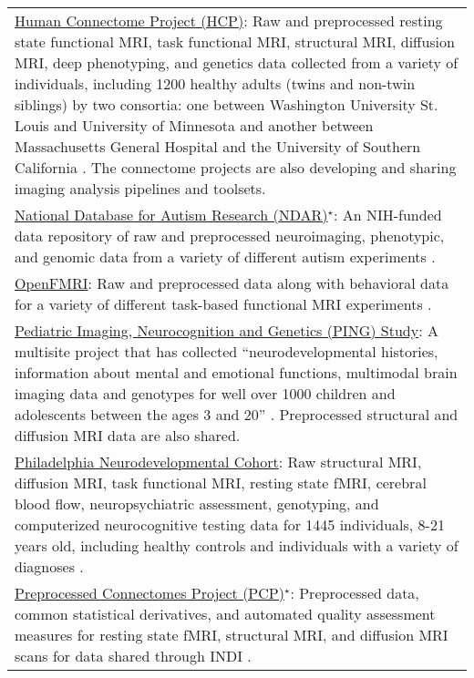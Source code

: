 \documentclass{bmcart}
\begin{document}
\begin{backmatter}
\begin{table}[h!]
\begin{tabular}{L{5.5in}}
        \href{http://www.humanconnectomeproject.org/}{Human Connectome Project (HCP)}: Raw and preprocessed resting state functional MRI, task functional MRI, structural MRI, diffusion MRI, deep phenotyping, and genetics data collected from a variety of individuals, including 1200 healthy adults (twins and non-twin siblings) by two consortia: one between Washington University St. Louis and University of Minnesota \cite{VanEssen2012} and another between Massachusetts General Hospital and the University of Southern California \cite{RosenHCP2010}. The connectome projects are also developing and sharing imaging analysis pipelines and toolsets.\\
        \href{http://ndar.nih.gov/}{National Database for Autism Research (NDAR)}$^{\star}$: An NIH-funded data repository of raw and preprocessed neuroimaging, phenotypic, and genomic data from a variety of different autism experiments \cite{NDAR}.\\	
        \href{https://openfmri.org/}{OpenFMRI}: Raw and preprocessed data along with behavioral data for a variety of different task-based functional MRI experiments \cite{openfmri}. \\
        \href{http://pingstudy.ucsd.edu/}{Pediatric Imaging, Neurocognition and Genetics (PING) Study}: A multisite project that has collected ``neurodevelopmental histories, information about mental and emotional functions, multimodal brain imaging data and genotypes for well over 1000 children and adolescents between the ages 3 and 20'' \cite{JerniganPING}. Preprocessed structural and diffusion MRI data are also shared.\\
        \href{http://www.med.upenn.edu/bbl/projects/pnc/PhiladelphiaNeurodevelopmentalCohort.shtml}{Philadelphia Neurodevelopmental Cohort}: Raw structural MRI, diffusion MRI, task functional MRI, resting state fMRI, cerebral blood flow, neuropsychiatric assessment, genotyping, and computerized neurocognitive testing data for 1445 individuals, 8-21 years old, including healthy controls and individuals with a variety of diagnoses \cite{Satterthwaite2014}.\\
        \href{http://preprocessed-connectomes-project.github.io/}{Preprocessed Connectomes Project (PCP)}$^{\star}$: Preprocessed data, common statistical derivatives, and automated quality assessment measures for resting state fMRI, structural MRI, and diffusion MRI scans for data shared through INDI \cite{CraddockPCP}. \\
        \hline
      \end{tabular}
\end{table}

\end{backmatter}
\end{document}
